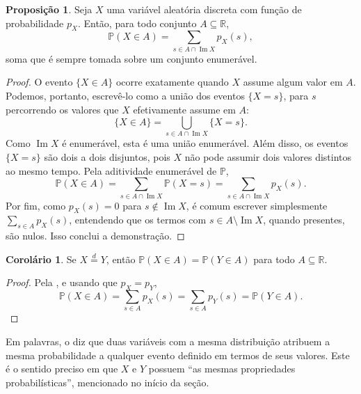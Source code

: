 \documentclass[12pt,portuguese]{article}
\theoremstyle{definition}
\newtheorem{proposition}[proposition]{Proposição}
\newtheorem{corollary}[corollary]{Corolário}
\begin{document}
\begin{proposition}\label{prop:massa-determina-probabilidades}
Seja $X$ uma variável aleatória discreta com função de probabilidade $p_X$. Então,
para todo conjunto $A \subseteq \mathbb{R}$,
\[
  \mathbb{P}(X \in A) = \sum_{s \in A \cap \operatorname{Im} X} p_X(s),
\]
soma que é sempre tomada sobre um conjunto enumerável.
\end{proposition}

\begin{proof}
O evento $\{X \in A\}$ ocorre exatamente quando $X$ assume algum valor em $A$. Podemos,
portanto, escrevê-lo como a união dos eventos $\{X = s\}$, para $s$ percorrendo os
valores que $X$ efetivamente assume em $A$:
\[
  \{X \in A\} = \bigcup_{s \in A \cap \operatorname{Im} X} \{X = s\}.
\]
Como $\operatorname{Im} X$ é enumerável, esta é uma união enumerável. Além disso, os
eventos $\{X = s\}$ são dois a dois disjuntos, pois $X$ não pode assumir dois valores
distintos ao mesmo tempo. Pela aditividade enumerável de $\mathbb{P}$,
\[
  \mathbb{P}(X \in A) = \sum_{s \in A \cap \operatorname{Im} X} \mathbb{P}(X = s)
  = \sum_{s \in A \cap \operatorname{Im} X} p_X(s).
\]
Por fim, como $p_X(s) = 0$ para $s \notin \operatorname{Im} X$, é comum escrever
simplesmente $\sum_{s \in A} p_X(s)$, entendendo que os termos com
$s \in A \setminus \operatorname{Im} X$, quando presentes, são nulos. Isso conclui
a demonstração.
\end{proof}

\begin{corollary}\label{cor:mesma-distribuicao-mesmas-probabilidades}
Se $X \overset{d}{=} Y$, então $\mathbb{P}(X \in A) = \mathbb{P}(Y \in A)$ para todo
$A \subseteq \mathbb{R}$.
\end{corollary}

\begin{proof}
Pela , e usando que $p_X = p_Y$,
\[
  \mathbb{P}(X \in A) = \sum_{s \in A} p_X(s) = \sum_{s \in A} p_Y(s)
  = \mathbb{P}(Y \in A).
\]
\end{proof}

Em palavras, o  diz que duas
variáveis com a mesma distribuição atribuem a mesma probabilidade a qualquer evento
definido em termos de seus valores. Este é o sentido preciso em que $X$ e $Y$ possuem
``as mesmas propriedades probabilísticas'', mencionado no início da seção.
\end{document}
